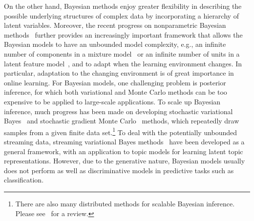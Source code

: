 \documentclass[twoside,11pt]{article}
\begin{document}
On the other hand, Bayesian methods enjoy greater flexibility in describing the possible underlying structures of complex data by incorporating a hierarchy of latent variables. Moreover, the recent progress on nonparametric Bayesian methods~\citep{hjort2010bayesian,teh2006hierarchical} further provides an increasingly important framework that allows the Bayesian models to have an unbounded model complexity, e.g., an infinite number of components in a mixture model~\citep{hjort2010bayesian} or an infinite number of units in a latent feature model~\citep{Griffiths:tr05}, and to adapt when the learning environment changes. In particular, adaptation to the changing environment is of great importance in online learning. For Bayesian models, one challenging problem is posterior inference, for which both variational and Monte Carlo methods can be too expensive to be applied to large-scale applications. To scale up Bayesian inference, much progress has been made on developing stochastic variational Bayes~\citep{hoffman2013stochastic,mimno2012sparse} and stochastic gradient Monte Carlo~\citep{welling2011bayesian,welling2012mc} methods, which repeatedly draw samples from a given finite data set.\footnote{There are also many distributed methods for scalable Bayesian inference. Please see~\citep{Zhu:bigBayes2014} for a review. } To deal with the potentially unbounded streaming data, streaming variational Bayes methods~\citep{broderick2013streaming} have been developed as a general framework, with an application to topic models for learning latent topic representations. However, due to the generative nature, Bayesian models usually does not perform as well as discriminative models in predictive tasks such as classification.
\end{document}
